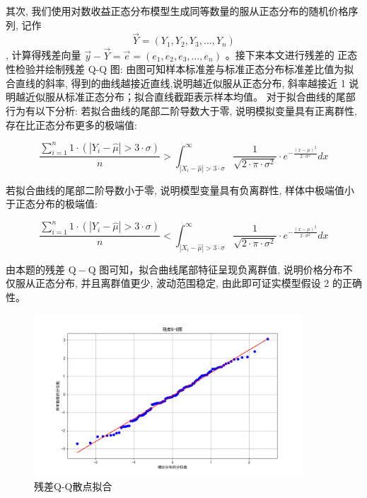 \documentclass[12pt]{ctexart}
\begin{document}
\begin{enumerate}[(1)]
	
	其次, 我们使用对数收益正态分布模型生成同等数量的服从正态分布的随机价格序列, 记作
	\begin{equation*}
		\vec{Y}=\left(Y_1, Y_2, Y_3, \ldots, Y_n\right)
	\end{equation*}
	, 计算得残差向量 $\vec{y}-\vec{Y}=\vec{e}=\left(e_1, e_2, e_3, \ldots, e_n\right)$ 。接下来本文进行残差的
	正态性检验并绘制残差 Q-Q 图:
	由图可知样本标准差与标准正态分布标准差比值为拟合直线的斜率, 得到的曲线越接近直线,说明越近似服从正态分布, 斜率越接近 1 说明越近似服从标准正态分布；拟合直线截距表示样本均值。
	对于拟合曲线的尾部行为有以下分析:
	若拟合曲线的尾部二阶导数大于零, 说明模拟变量具有正离群性, 存在比正态分布更多的极端值:
	
	\begin{equation}
	\frac{\sum_{i=1}^n 1 \cdot\left(\left|Y_i-\hat{\mu}\right|>3 \cdot \sigma\right)}{n}>\int_{\left|X_i-\hat{\mu}\right|>3 \cdot \sigma}^{\infty} \frac{1}{\sqrt{2 \cdot \pi \cdot \sigma^2}} \cdot e^{-\frac{(x-\mu)^2}{2 \cdot \sigma^2}} d x
	\end{equation}
	
	若拟合曲线的尾部二阶导数小于零, 说明模型变量具有负离群性, 样体中极端值小于正态分布的极端值:
	
	\begin{equation}
	\frac{\sum_{i=1}^n 1 \cdot\left(\left|Y_i-\hat{\mu}\right|>3 \cdot \sigma\right)}{n}<\int_{\left|X_i-\hat{\mu}\right|>3 \cdot \sigma}^{\infty} \frac{1}{\sqrt{2 \cdot \pi \cdot \sigma^2}} \cdot e^{-\frac{(x-\mu)^2}{2 \cdot \sigma^2}} d x
\end{equation}
	
	
	由本题的残差 $\mathrm{Q}-\mathrm{Q}$ 图可知，拟合曲线尾部特征呈现负离群值, 说明价格分布不仅服从正态分布, 并且离群值更少, 波动范围稳定, 由此即可证实模型假设 2 的正确性。
\end{enumerate}
\begin{figure}[h]
	\centering
	\includegraphics[width=0.9\textwidth]{image15.png}  %
	\caption{残差Q-Q散点拟合}
	\label{fig:yield_comparison1}
\end{figure}
\end{document}
